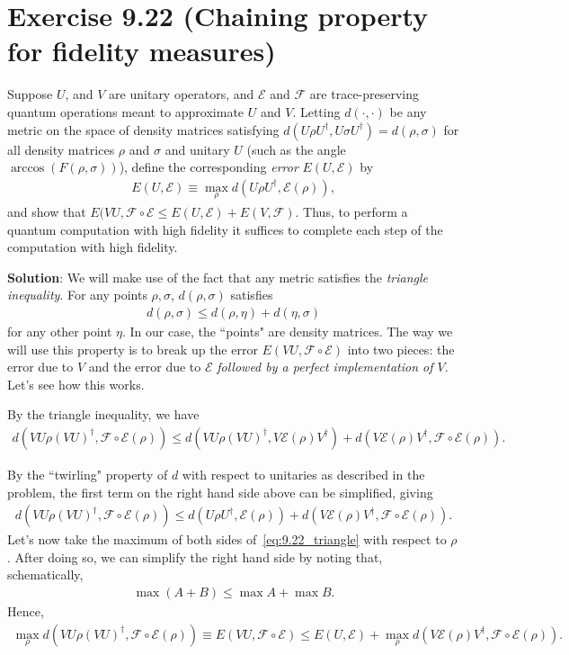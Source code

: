 \documentclass{book}
\newcommand{\mc}[1]{\mathcal{#1}}
\begin{document}
\section*{Exercise 9.22 (Chaining property for fidelity measures)}
    Suppose $U$, and $V$ are unitary operators, and $\mc{E}$ and $\mc{F}$ are trace-preserving quantum operations meant to approximate $U$ and $V$. Letting $d(\cdot,\cdot)$ be any metric on the space of density matrices satisfying $d(U\rho U^\dagger, U\sigma U^\dagger) = d(\rho, \sigma)$ for all density matrices $\rho$ and $\sigma$ and unitary $U$ (such as the angle $\arccos(F(\rho,\sigma))$), define the corresponding \emph{error} $E(U, \mc{E})$ by 
    \begin{align}
        E(U, \mc{E}) \equiv \max_\rho d(U\rho U^\dagger, \mc{E}(\rho)),
    \end{align}
    and show that $E(VU, \mc{F}\circ \mc{E} \leq E(U, \mc{E}) + E(V, \mc{F})$. Thus, to perform a quantum computation with high fidelity it suffices to complete each step of the computation with high fidelity.

    \textbf{Solution}: We will make use of the fact that any metric satisfies the \emph{triangle inequality}. For any points $\rho, \sigma$, $d(\rho, \sigma)$ satisfies
    \begin{align}
        d(\rho, \sigma) \leq d(\rho, \eta) + d(\eta, \sigma)
    \end{align}
    for any other point $\eta$. In our case, the ``points" are density matrices. The way we will use this property is to break up the error $E(VU, \mc{F}\circ\mc{E})$ into two pieces: the error due to $V$ and the error due to $\mc{E}$ \emph{followed by a perfect implementation of $V$}. Let's see how this works.

    By the triangle inequality, we have
    \begin{align}
        d(VU \rho (VU)^\dagger, \mc{F}\circ\mc{E}(\rho)) \leq d(VU \rho (VU)^\dagger, V \mc{E}(\rho) V^\dagger) + d(V \mc{E}(\rho) V^\dagger, \mc{F}\circ\mc{E}(\rho)).
    \end{align}

    By the ``twirling" property of $d$ with respect to unitaries as described in the problem, the first term on the right hand side above can be simplified, giving
    \begin{align} \label{eq:9.22_triangle}
        d(VU \rho (VU)^\dagger, \mc{F}\circ\mc{E}(\rho)) \leq d(U \rho U^\dagger, \mc{E}(\rho)) + d(V \mc{E}(\rho) V^\dagger, \mc{F}\circ\mc{E}(\rho)).
    \end{align}
    Let's now take the maximum of both sides of~\eqref{eq:9.22_triangle} with respect to $\rho$. After doing so, we can simplify the right hand side by noting that, schematically,
    \begin{align}
        \max (A + B) \leq \max A + \max B.
    \end{align}
    Hence,
    \begin{align} \label{eq:9.22_maximize}
        \max_\rho d(VU \rho (VU)^\dagger, \mc{F}\circ\mc{E}(\rho))  \equiv E(VU, \mc{F}\circ\mc{E}) \leq E(U, \mc{E}) + \max_\rho d(V \mc{E}(\rho) V^\dagger, \mc{F}\circ\mc{E}(\rho)).
    \end{align}
    
\end{document}
